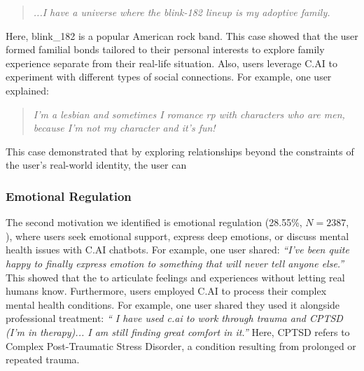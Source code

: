 \documentclass[sigconf, nonacm]{acmart}
\newcommand{\implications}[1]{{\color{black}{#1}}}
\newcommand{\newfinding}[1]{{\color{black}{#1}}}
\begin{document}
\begin{quote}
    \textit{...I have a universe where the blink-182 lineup is my adoptive family.}
\end{quote}

Here, blink\_182 is a popular American rock band. This case showed that the user formed familial bonds tailored to their personal interests to explore family experience separate from their real-life situation. Also, users leverage C.AI to experiment with different types of social connections. For example, one user explained:

\begin{quote}
    \textit{I'm a lesbian and sometimes I romance rp with characters who are men, because I'm not my character and it's fun!}
\end{quote}

This case demonstrated that by exploring relationships beyond the constraints of the user's real-world identity, the user can \newfinding{satisfy their curiosity about different relational experiences, a key component of social fulfillment.}

\subsubsection{Emotional Regulation}
\label{EmotionalRegulation}
The second motivation we identified is emotional regulation (28.55\%, $N=2387$, \implications{or 10.67\% of all posts}), where users seek emotional support, express deep emotions, or discuss mental health issues with C.AI chatbots. \newfinding{Users viewed the C.AI chatbot as a confidant providing emotional freedom.} For example, one user shared: \textit{``I've been quite happy to finally express emotion to something that will never tell anyone else.''} This showed that the \newfinding{C.AI's perceived confidentiality} to articulate feelings and experiences without letting real humans know. Furthermore, users employed C.AI to process their complex mental health conditions. For example, one user shared they used it alongside professional treatment: \textit{`` I have used c.ai to work through trauma and CPTSD (I'm in therapy)... I am still finding great comfort in it.''} Here, CPTSD refers to Complex Post-Traumatic Stress Disorder, a condition resulting from prolonged or repeated trauma. \newfinding{This suggested that the user perceived C.AI as a therapeutic and accessible emotional resource to supplement formal care.}
\end{document}
